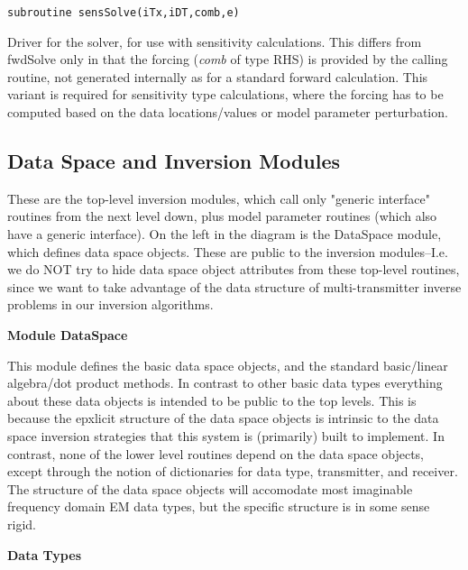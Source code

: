 \documentclass[12pt]{article}
\begin{document}
\begin{verbatim}
subroutine sensSolve(iTx,iDT,comb,e)
\end{verbatim}

Driver for the solver, for use with sensitivity calculations.
This differs from fwdSolve only in that the forcing
({\it comb} of type RHS) is provided by the calling routine,
not generated internally as for a standard forward calculation.
This variant is required for sensitivity type calculations, where the
forcing has to be computed based on the data locations/values
or model parameter perturbation.

\subsection{Data Space and Inversion Modules}

These are the top-level inversion modules, which call only 
"generic interface" routines from the next level down, plus
model parameter routines (which also have a generic interface).
On the left in the diagram is the DataSpace module, which defines
data space objects.  These are public to the inversion modules--I.e.
we do NOT try to hide data space object attributes from
these top-level routines, since we want to take advantage of
the data structure of multi-transmitter inverse problems in
our inversion algorithms.

\vspace{10pt}

\noindent
{\bf Module DataSpace}

This module defines the basic data space objects, and the standard
basic/linear algebra/dot product methods.  In contrast
to other basic data types everything about these
data objects is intended to be
public to the top levels.  This is because the epxlicit structure
of the data space objects is intrinsic to the data space inversion strategies
that this system is (primarily) built to implement.
In contrast, none of the lower level routines depend on the
data space objects, except through the notion of dictionaries
for data type, transmitter, and receiver.  The structure of the
data space objects will accomodate most imaginable frequency domain 
EM data types, but the specific structure is in some sense rigid.

\vspace{10pt}

\noindent
{\bf Data Types}

\vspace{6pt}
\end{document}
